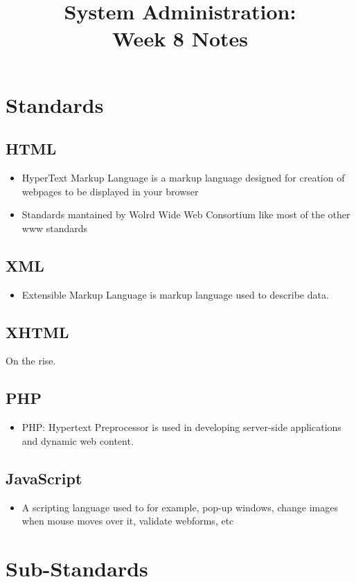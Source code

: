 \documentclass[10pt]
{article}
\begin{document}
\title{System Administration:\\ Week 8 Notes}
\maketitle
\section{Standards}
\subsection{HTML}
\begin{itemize}
\item HyperText Markup Language is a markup language designed for creation of webpages to be displayed in your browser
\item Standards mantained by Wolrd Wide Web Consortium like most of the other www standards
\end{itemize}
\subsection{XML}
\begin{itemize}
\item Extensible Markup Language is markup language used to describe data.
\end{itemize}
\subsection{XHTML}
On the rise. 
\subsection{PHP}
\begin{itemize}
\item PHP: Hypertext Preprocessor is used in developing server-side applications and dynamic web content.
\end{itemize}
\subsection{JavaScript}
\begin{itemize}
\item A scripting language used to for example,  pop-up windows, change images when mouse moves over it, validate webforms, etc
\end{itemize}
\section{Sub-Standards}
\end{document}
